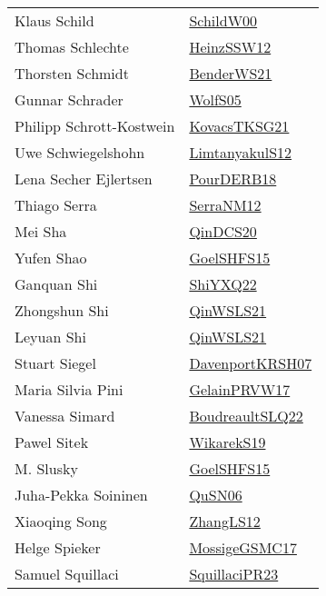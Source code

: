 {\begin{longtable}{p{4cm}p{20cm}}
Klaus Schild & \href{articles/SchildW00.pdf}{SchildW00}\cite{SchildW00} \\
Thomas Schlechte & \href{articles/HeinzSSW12.pdf}{HeinzSSW12}\cite{HeinzSSW12} \\
Thorsten Schmidt & \href{papers/BenderWS21.pdf}{BenderWS21}\cite{BenderWS21} \\
Gunnar Schrader & \href{papers/WolfS05.pdf}{WolfS05}\cite{WolfS05} \\
Philipp Schrott{-}Kostwein & \href{papers/KovacsTKSG21.pdf}{KovacsTKSG21}\cite{KovacsTKSG21} \\
Uwe Schwiegelshohn & \href{articles/LimtanyakulS12.pdf}{LimtanyakulS12}\cite{LimtanyakulS12} \\
Lena Secher Ejlertsen & \href{articles/PourDERB18.pdf}{PourDERB18}\cite{PourDERB18} \\
Thiago Serra & \href{papers/SerraNM12.pdf}{SerraNM12}\cite{SerraNM12} \\
Mei Sha & \href{articles/QinDCS20.pdf}{QinDCS20}\cite{QinDCS20} \\
Yufen Shao & \href{articles/GoelSHFS15.pdf}{GoelSHFS15}\cite{GoelSHFS15} \\
Ganquan Shi & \href{articles/ShiYXQ22.pdf}{ShiYXQ22}\cite{ShiYXQ22} \\
Zhongshun Shi & \href{articles/QinWSLS21.pdf}{QinWSLS21}\cite{QinWSLS21} \\
Leyuan Shi & \href{articles/QinWSLS21.pdf}{QinWSLS21}\cite{QinWSLS21} \\
Stuart Siegel & \href{papers/DavenportKRSH07.pdf}{DavenportKRSH07}\cite{DavenportKRSH07} \\
Maria Silvia Pini & \href{papers/GelainPRVW17.pdf}{GelainPRVW17}\cite{GelainPRVW17} \\
Vanessa Simard & \href{papers/BoudreaultSLQ22.pdf}{BoudreaultSLQ22}\cite{BoudreaultSLQ22} \\
Pawel Sitek & \href{articles/WikarekS19.pdf}{WikarekS19}\cite{WikarekS19} \\
M. Slusky & \href{articles/GoelSHFS15.pdf}{GoelSHFS15}\cite{GoelSHFS15} \\
Juha{-}Pekka Soininen & \href{papers/QuSN06.pdf}{QuSN06}\cite{QuSN06} \\
Xiaoqing Song & \href{papers/ZhangLS12.pdf}{ZhangLS12}\cite{ZhangLS12} \\
Helge Spieker & \href{papers/MossigeGSMC17.pdf}{MossigeGSMC17}\cite{MossigeGSMC17} \\
Samuel Squillaci & \href{papers/SquillaciPR23.pdf}{SquillaciPR23}\cite{SquillaciPR23} \\

\end{longtable}}
